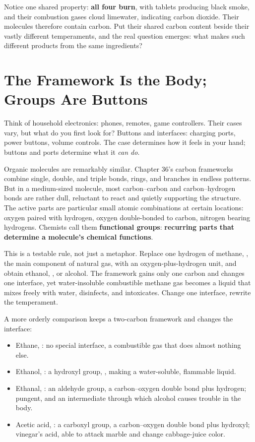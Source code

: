 Notice one shared property: \textbf{all four burn}, with tablets producing black smoke, and their combustion gases cloud limewater, indicating carbon dioxide. Their molecules therefore contain carbon. Put their shared carbon content beside their vastly different temperaments, and the real question emerges: what makes such different products from the same ingredients?

\section{The Framework Is the Body; Groups Are Buttons}

Think of household electronics: phones, remotes, game controllers. Their cases vary, but what do you first look for? Buttons and interfaces: charging ports, power buttons, volume controls. The case determines how it feels in your hand; buttons and ports determine what it \emph{can do}.

Organic molecules are remarkably similar. Chapter 36's carbon frameworks combine single, double, and triple bonds, rings, and branches in endless patterns. But in a medium-sized molecule, most carbon--carbon and carbon--hydrogen bonds are rather dull, reluctant to react and quietly supporting the structure. The active parts are particular small atomic combinations at certain locations: oxygen paired with hydrogen, oxygen double-bonded to carbon, nitrogen bearing hydrogens. Chemists call them \textbf{functional groups}: \textbf{recurring parts that determine a molecule's chemical functions}.

This is a testable rule, not just a metaphor. Replace one hydrogen of methane, , the main component of natural gas, with an oxygen-plus-hydrogen unit, and obtain ethanol, , or alcohol. The framework gains only one carbon and changes one interface, yet water-insoluble combustible methane gas becomes a liquid that mixes freely with water, disinfects, and intoxicates. Change one interface, rewrite the temperament.

A more orderly comparison keeps a two-carbon framework and changes the interface:

\begin{itemize}[itemsep=2pt]
\item Ethane, : no special interface, a combustible gas that does almost nothing else.
\item Ethanol, : a hydroxyl group, , making a water-soluble, flammable liquid.
\item Ethanal, : an aldehyde group, a carbon--oxygen double bond plus hydrogen; pungent, and an intermediate through which alcohol causes trouble in the body.
\item Acetic acid, : a carboxyl group, a carbon--oxygen double bond plus hydroxyl; vinegar's acid, able to attack marble and change cabbage-juice color.
\end{itemize}

